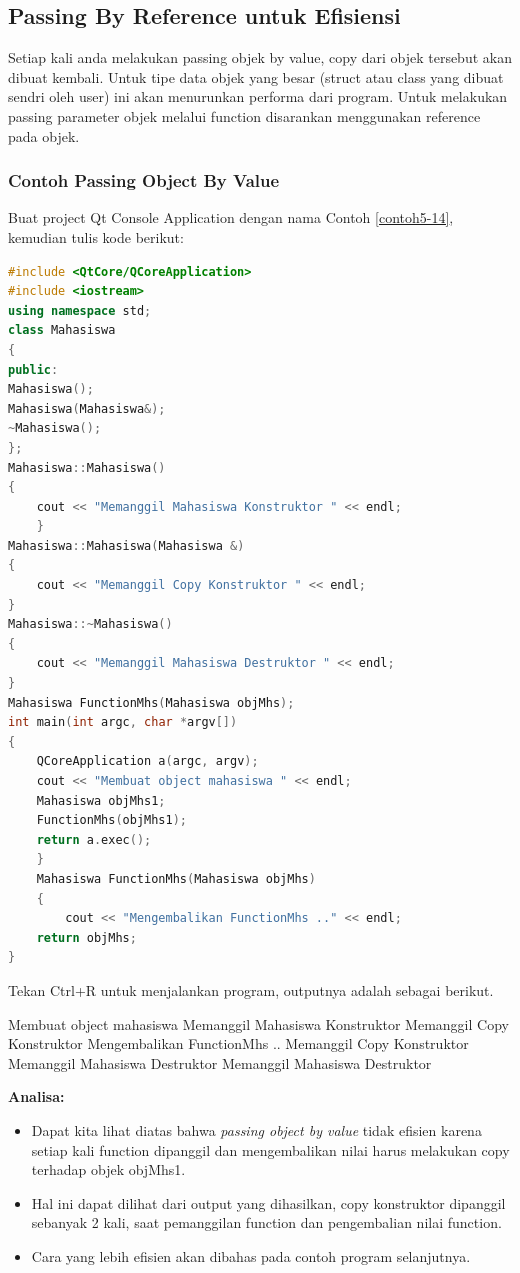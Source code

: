 \subsection{Passing By Reference untuk
Efisiensi}\label{passing-by-reference-untuk-efisiensi}

Setiap kali anda melakukan passing objek by value, copy dari objek
tersebut akan dibuat kembali. Untuk tipe data objek yang besar (struct
atau class yang dibuat sendri oleh user) ini akan menurunkan performa
dari program. Untuk melakukan passing parameter objek melalui function
disarankan menggunakan reference pada objek.

\subsubsection*{Contoh  Passing Object By Value}

Buat project Qt Console Application dengan nama Contoh \ref{contoh5-14}, kemudian
tulis kode berikut:

\begin{lstlisting}[language=c++, caption=Passing Object By Value, label=contoh5-14]
#include <QtCore/QCoreApplication>
#include <iostream>
using namespace std;
class Mahasiswa
{
public:
Mahasiswa();
Mahasiswa(Mahasiswa&);
~Mahasiswa();
};
Mahasiswa::Mahasiswa()
{
    cout << "Memanggil Mahasiswa Konstruktor " << endl;
    }
Mahasiswa::Mahasiswa(Mahasiswa &)
{
    cout << "Memanggil Copy Konstruktor " << endl;
}
Mahasiswa::~Mahasiswa()
{
    cout << "Memanggil Mahasiswa Destruktor " << endl;
}
Mahasiswa FunctionMhs(Mahasiswa objMhs);
int main(int argc, char *argv[])
{
    QCoreApplication a(argc, argv);
    cout << "Membuat object mahasiswa " << endl;
    Mahasiswa objMhs1;
    FunctionMhs(objMhs1);
    return a.exec();
    }
    Mahasiswa FunctionMhs(Mahasiswa objMhs)
    {
        cout << "Mengembalikan FunctionMhs .." << endl;
    return objMhs;
}
\end{lstlisting}

Tekan Ctrl+R untuk menjalankan program, outputnya adalah sebagai
berikut.

\begin{lcverbatim}
Membuat object mahasiswa
Memanggil Mahasiswa Konstruktor
Memanggil Copy Konstruktor
Mengembalikan FunctionMhs ..
Memanggil Copy Konstruktor
Memanggil Mahasiswa Destruktor
Memanggil Mahasiswa Destruktor
\end{lcverbatim}

\textbf{Analisa:}

\begin{itemize}

\item
  Dapat kita lihat diatas bahwa \emph{passing object by value} tidak
  efisien karena setiap kali function dipanggil dan mengembalikan nilai
  harus melakukan copy terhadap objek objMhs1.
\item
  Hal ini dapat dilihat dari output yang dihasilkan, copy konstruktor
  dipanggil sebanyak 2 kali, saat pemanggilan function dan pengembalian
  nilai function.
\item
  Cara yang lebih efisien akan dibahas pada contoh program selanjutnya.
\end{itemize}

